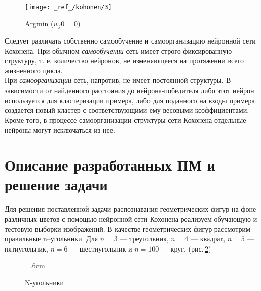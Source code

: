 \documentclass[12pt,a4paper]{article}
\begin{document}
\begin{figure}[h!]
	\centering
	\texttt{[image: \_ref\_/kohonen/3]}
	\caption{Argmin ($w_j0 = 0$)\label{fig:03}}
\end{figure}

Следует различать собственно самообучение и самоорганизацию нейронной сети Кохонена. При обычном \emph{самообучении} сеть имеет строго фиксированную структуру, т. е. количество нейронов, не изменяющееся на протяжении всего жизненного цикла. \\
При \emph{самоорганизации} сеть, напротив, не имеет постоянной структуры. В зависимости от найденного расстояния до нейрона-победителя либо этот нейрон используется для кластеризации примера, либо для поданного на входы примера создается новый кластер с соответствующими ему весовыми коэффициентами. Кроме того, в процессе самоорганизации структуры сети Кохонена отдельные нейроны могут исключаться из нее.


\section{Описание разработанных ПМ и решение задачи}

Для решения поставленной задачи распознавания геометрических фигур на фоне различных цветов с помощью нейронной сети Кохонена реализуем обучающую и тестовую выборки изображений. В качестве геометрических фигур рассмотрим правильные n–угольники. Для $n = 3$ — треугольник, $n = 4$ — квадрат, $n = 5$ — пятиугольник, $n = 6$ — шестиугольник и $n = 100$ — круг. (рис.\,\ref{fig:04})

\begin{figure}[tbh!]
	\center
	\newdimen\R
	\R=.6cm
	\caption{N-угольники}
	\label{fig:04}
\end{figure}
\end{document}
